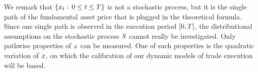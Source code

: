 \documentclass[10pt,a4paper]{article}
\begin{document}
	We remark that $\lbrace x_t : \, 0\leq t\leq T\rbrace$ is not a stochastic process, but it is the single path of the fundamental asset price that is plugged in the theoretical formula. Since one single path is observed in the execution period ${[0,T]}$, the distributional assumptions on the stochastic process $S$ cannot really be investigated. Only pathwise properties of $x$ can be measured. One of such properties is the quadratic variation of $x$, on which the calibration of our dynamic models of trade execution will be based. 
%	
%	
\end{document}
